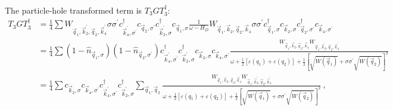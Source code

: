 \documentclass{revtex4-2}
\begin{document}
The particle-hole transformed term is \(T_3 G T_3^\dagger\):
\begin{equation}\begin{aligned}
	T_3 G T_3^\dagger &= \frac{1}{4}\sum  W_{\vec q_1,\vec k_2^\prime, \vec q_2, \vec k_4^\prime} \sigma\sigma^\prime c^\dagger_{\vec k^\prime_4,\sigma^\prime} c_{\vec q_2,\sigma^\prime} c^\dagger_{\vec k^\prime_2,\sigma} c_{\vec q_1,\sigma}\frac{1}{\omega - H_D}W_{\vec q_1,\vec k_2, \vec q_2, \vec k_4} \sigma\sigma^\prime c^\dagger_{\vec q_1,\sigma}c_{\vec k_2,\sigma}c^\dagger_{\vec q_2,\sigma^\prime}c_{\vec k_4,\sigma^\prime} \\
			  &= \frac{1}{4}\sum \left(1 - \hat n_{\vec q_1,\sigma}\right) \left(1 - \hat n_{\vec q_2,\sigma^\prime}\right) c^\dagger_{\vec k^\prime_4,\sigma^\prime} c^\dagger_{\vec k^\prime_2,\sigma}  c_{\vec k_2,\sigma} c_{\vec k_4,\sigma^\prime}\frac{W_{\vec q_1,\vec k_2, \vec q_2, \vec k_4} W_{\vec q_1,\vec k_2^\prime, \vec q_2, \vec k_4^\prime}}{\omega + \frac{1}{2}\left[\varepsilon(q_1) + \varepsilon(q_2)\right] + \frac{1}{2}\left[\sqrt{W\left(\vec q_1\right)} + \sigma\sigma^\prime\sqrt{W\left(\vec q_2\right)}\right]^2}\\
			  &= \frac{1}{4}\sum c_{\vec k_2,\sigma} c_{\vec k_4,\sigma^\prime} c^\dagger_{\vec k^\prime_4,\sigma^\prime} c^\dagger_{\vec k^\prime_2,\sigma} \sum_{\vec q_1, \vec q_2}\frac{W_{\vec q_1,\vec k_2, \vec q_2, \vec k_4} W_{\vec q_1,\vec k_2^\prime, \vec q_2, \vec k_4^\prime}}{\omega + \frac{1}{2}\left[\varepsilon(q_1) + \varepsilon(q_2)\right] + \frac{1}{2}\left[\sqrt{W\left(\vec q_1\right)} + \sigma\sigma^\prime\sqrt{W\left(\vec q_2\right)}\right]^2}~,
\end{aligned}\end{equation}
\end{document}
